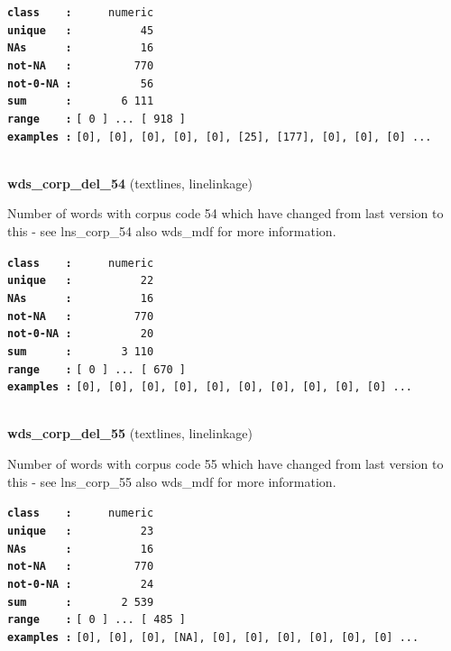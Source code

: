 \documentclass[]{article}
\begin{document}
\textbf{\texttt{class\ \ \ \ :}} \texttt{~~~~~numeric}\\
\textbf{\texttt{unique\ \ \ :}} \texttt{~~~~~~~~~~45}\\
\textbf{\texttt{NAs\ \ \ \ \ \ :}} \texttt{~~~~~~~~~~16}\\
\textbf{\texttt{not-NA\ \ \ :}} \texttt{~~~~~~~~~770}\\
\textbf{\texttt{not-0-NA\ :}} \texttt{~~~~~~~~~~56}\\
\textbf{\texttt{sum\ \ \ \ \ \ :}} \texttt{~~~~~~~6~111}\\
\textbf{\texttt{range\ \ \ \ :}}
\texttt{{[}\ 0\ {]}\ ...\ {[}\ 918\ {]}}\\
\textbf{\texttt{examples\ :}}
\texttt{{[}0{]},\ {[}0{]},\ {[}0{]},\ {[}0{]},\ {[}0{]},\ {[}25{]},\ {[}177{]},\ {[}0{]},\ {[}0{]},\ {[}0{]}\ ...}\\

~

\textbf{wds\_corp\_del\_54} (textlines, linelinkage)

Number of words with corpus code 54 which have changed from last version
to this - see lns\_corp\_54 also wds\_mdf for more information.

\textbf{\texttt{class\ \ \ \ :}} \texttt{~~~~~numeric}\\
\textbf{\texttt{unique\ \ \ :}} \texttt{~~~~~~~~~~22}\\
\textbf{\texttt{NAs\ \ \ \ \ \ :}} \texttt{~~~~~~~~~~16}\\
\textbf{\texttt{not-NA\ \ \ :}} \texttt{~~~~~~~~~770}\\
\textbf{\texttt{not-0-NA\ :}} \texttt{~~~~~~~~~~20}\\
\textbf{\texttt{sum\ \ \ \ \ \ :}} \texttt{~~~~~~~3~110}\\
\textbf{\texttt{range\ \ \ \ :}}
\texttt{{[}\ 0\ {]}\ ...\ {[}\ 670\ {]}}\\
\textbf{\texttt{examples\ :}}
\texttt{{[}0{]},\ {[}0{]},\ {[}0{]},\ {[}0{]},\ {[}0{]},\ {[}0{]},\ {[}0{]},\ {[}0{]},\ {[}0{]},\ {[}0{]}\ ...}\\

~

\textbf{wds\_corp\_del\_55} (textlines, linelinkage)

Number of words with corpus code 55 which have changed from last version
to this - see lns\_corp\_55 also wds\_mdf for more information.

\textbf{\texttt{class\ \ \ \ :}} \texttt{~~~~~numeric}\\
\textbf{\texttt{unique\ \ \ :}} \texttt{~~~~~~~~~~23}\\
\textbf{\texttt{NAs\ \ \ \ \ \ :}} \texttt{~~~~~~~~~~16}\\
\textbf{\texttt{not-NA\ \ \ :}} \texttt{~~~~~~~~~770}\\
\textbf{\texttt{not-0-NA\ :}} \texttt{~~~~~~~~~~24}\\
\textbf{\texttt{sum\ \ \ \ \ \ :}} \texttt{~~~~~~~2~539}\\
\textbf{\texttt{range\ \ \ \ :}}
\texttt{{[}\ 0\ {]}\ ...\ {[}\ 485\ {]}}\\
\textbf{\texttt{examples\ :}}
\texttt{{[}0{]},\ {[}0{]},\ {[}0{]},\ {[}NA{]},\ {[}0{]},\ {[}0{]},\ {[}0{]},\ {[}0{]},\ {[}0{]},\ {[}0{]}\ ...}\\
\end{document}

